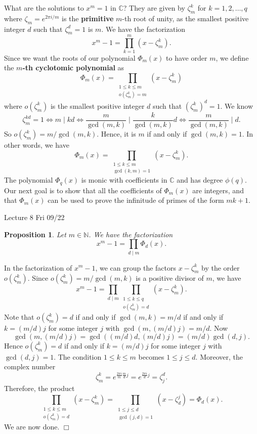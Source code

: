 \documentclass{article}
\def\N{{\mathbb N}}
\def\C{{\mathbb C}}
\newtheorem{proposition}[subsection]{Proposition}
\newenvironment{proof}{\noindent {\bf Proof:}}{$\Box$ \vspace{2 ex}}
\newcommand{\add}[1]{{\color{blue} #1}}
\begin{document}
What are the solutions to $x^m = 1$ in $\C$? They are given by $\zeta_m^k$ for $k = 1,2,\ldots, q$ where $\zeta_m = e^{2\pi i/m}$ is the \textbf{primitive} $m$-th root of unity, as the smallest positive integer $d$ such that $\zeta_m^d = 1$ is $m$. We have the factorization 
$$x^m - 1 = \prod_{k=1}^m (x - \zeta_m^k).$$
Since we want the roots of our polynomial $\Phi_m(x)$ to have order $m$, we define the \textbf{$m$-th cyclotomic polynomial} as
$$\Phi_m(x) = \prod_{\substack{1\leq k\leq m\\ o(\zeta_m^k) = m}}(x - \zeta_m^k)$$
where $o(\zeta_m^k)$ is the smallest positive integer $d$ such that $(\zeta_m^k)^d = 1$. We know
$$\zeta_m^{kd} = 1 \Leftrightarrow m\mid kd \Leftrightarrow \frac{m}{\gcd(m,k)}\mid\frac{k}{\gcd(m,k)}d\Leftrightarrow \frac{m}{\gcd(m,k)}\mid d.$$
So $o(\zeta_m^k) = m/\gcd(m,k).$ Hence, it is $m$ if and only if $\gcd(m,k) = 1$. In other words, we have
$$\Phi_m(x) = \prod_{\substack{1\leq k\leq m\\ \gcd(k,m)=1}}(x - \zeta_m^k).$$
 The polynomial $\Phi_q(x)$ is monic with coefficients in $\C$ and has degree $\phi(q)$. Our next goal is to show that all the coefficients of $\Phi_m(x)$ are integers, and that $\Phi_m(x)$ can be used to prove the infinitude of primes of the form $mk + 1$.
 
\begin{center}
    \add{Lecture 8 Fri 09/22}
\end{center}

\begin{proposition}
    Let $m\in\N$. We have the factorization $$x^m - 1 = \prod_{d\mid m}\Phi_d(x).$$
\end{proposition}

\begin{proof}
    In the factorization of $x^m - 1$, we can group the factors $x - \zeta_m^k$ by the order $o(\zeta_m^k)$. Since $o(\zeta_m^k) = m/\gcd(m,k)$ is a positive divisor of $m$, we have
    $$x^m - 1 = \prod_{d\mid m} \prod_{\substack{1\leq k\leq q\\ o(\zeta_m^k) = d}}(x - \zeta_m^k).$$
    Note that $o(\zeta_m^k) = d$ if and only if $\gcd(m,k) = m/d$ if and only if $k = (m/d)j$ for some integer $j$ with $\gcd(m,(m/d)j) = m/d.$ Now
    $$\gcd(m,(m/d)j) = \gcd((m/d)d,(m/d)j) = (m/d)\gcd(d,j).$$
    Hence $o(\zeta_m^k) = d$ if and only if $k = (m/d)j$ for some integer $j$ with $\gcd(d,j) = 1$. The condition $1\leq k\leq m$ becomes $1\leq j\leq d$. Moreover, the complex number $$\zeta_m^k = e^{\frac{2\pi i}{m}\frac{m}{d}j} = e^{\frac{2\pi i}{d}j} = \zeta_j^d.$$ Therefore, the product
    $$\prod_{\substack{1\leq k\leq m\\ o(\zeta_m^k) = d}}(x - \zeta_m^k) = \prod_{\substack{1\leq j\leq d\\ \gcd(j,d)=1}}(x - \zeta_d^j) = \Phi_d(x).$$
    We are now done.
\end{proof}
\end{document}
